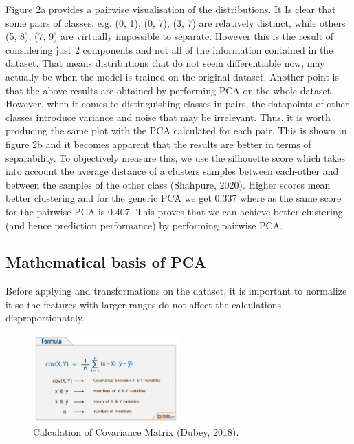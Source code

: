 \documentclass{article}
\begin{document}
Figure 2a provides a pairwise visualisation of the distributions.
It Is clear that some pairs of classes, e.g. (0, 1), (0, 7), (3, 7) are relatively distinct, while others (5, 8), (7, 9) are virtually impossible to separate.
However this is the result of considering just 2 components and not all of the information contained in the dataset.
That means distributions that do not seem differentiable now, may actually be when the model is trained on the original dataset.
Another point is that the above results are obtained by performing PCA on the whole dataset.
However, when it comes to distinguishing classes in pairs, the datapoints of other classes introduce variance and noise that may be irrelevant.
Thus, it is worth producing the same plot with the PCA calculated for each pair.
This is shown in figure 2b and it becomes apparent that the results are better in terms of separability.
To objectively measure this, we use the silhouette score which takes into account the average distance of a clusters samples between each-other and between the samples of the other class (Shahpure, 2020).
Higher scores mean better clustering and for the generic PCA we get 0.337 where as the same score for the pairwise PCA is 0.407.
This proves that we can achieve better clustering (and hence prediction performance) by performing pairwise PCA.


\subsection{Mathematical basis of PCA}
Before applying and transformations on the dataset, it is important to normalize it so the features with larger ranges do not affect the calculations disproportionately. 

\begin{figure}[h!]
    \centering
    \includegraphics[width=0.5\textwidth]{./plots/plot4.png}  %
    \caption{Calculation of Covariance Matrix (Dubey, 2018).}
    \label{fig:plot5}  %
\end{figure}
\end{document}
